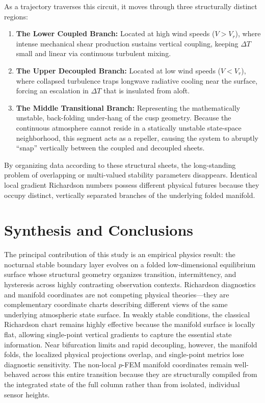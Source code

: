\documentclass[12pt,a4paper]{article}
\begin{document}
As a trajectory traverses this circuit, it moves through three structurally distinct regions:
\begin{enumerate}
  \item \textbf{The Lower Coupled Branch:} Located at high wind speeds ($V > V_r$), where intense mechanical shear production sustains vertical coupling, keeping $\Delta T$ small and linear via continuous turbulent mixing.
  \item \textbf{The Upper Decoupled Branch:} Located at low wind speeds ($V < V_r$), where collapsed turbulence traps longwave radiative cooling near the surface, forcing an escalation in $\Delta T$ that is insulated from aloft.
  \item \textbf{The Middle Transitional Branch:} Representing the mathematically unstable, back-folding under-hang of the cusp geometry. Because the continuous atmosphere cannot reside in a statically unstable state-space neighborhood, this segment acts as a repeller, causing the system to abruptly ``snap'' vertically between the coupled and decoupled sheets.
\end{enumerate}

By organizing data according to these structural sheets, the long-standing problem of overlapping or multi-valued stability parameters disappears. Identical local gradient Richardson numbers possess different physical futures because they occupy distinct, vertically separated branches of the underlying folded manifold.

\section{Synthesis and Conclusions}

The principal contribution of this study is an empirical physics result: the nocturnal stable boundary layer evolves on a folded low-dimensional equilibrium surface whose structural geometry organizes transition, intermittency, and hysteresis across highly contrasting observation contexts. Richardson diagnostics and manifold coordinates are not competing physical theories---they are complementary coordinate charts describing different views of the same underlying atmospheric state surface. In weakly stable conditions, the classical Richardson chart remains highly effective because the manifold surface is locally flat, allowing single-point vertical gradients to capture the essential state information. Near bifurcation limits and rapid decoupling, however, the manifold folds, the localized physical projections overlap, and single-point metrics lose diagnostic sensitivity. The non-local $p$-FEM manifold coordinates remain well-behaved across this entire transition because they are structurally compiled from the integrated state of the full column rather than from isolated, individual sensor heights.
\end{document}
